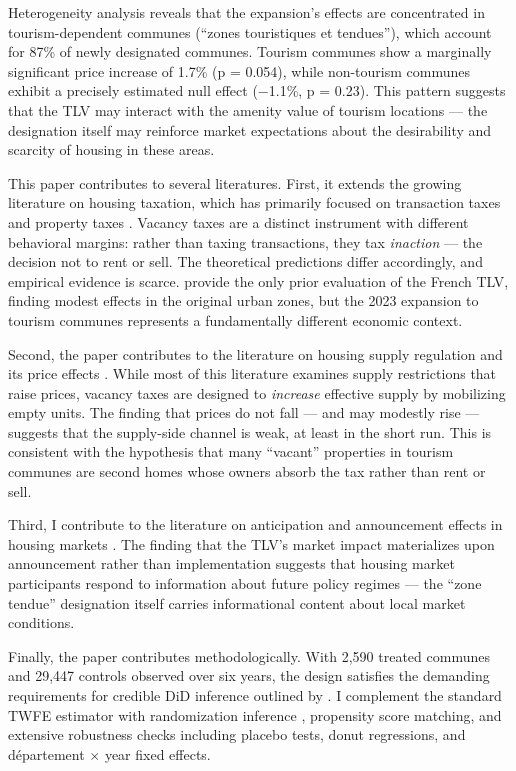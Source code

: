 \documentclass[12pt]{article}
\begin{document}
Heterogeneity analysis reveals that the expansion's effects are concentrated in tourism-dependent communes (``zones touristiques et tendues''), which account for 87\% of newly designated communes. Tourism communes show a marginally significant price increase of 1.7\% (p = 0.054), while non-tourism communes exhibit a precisely estimated null effect ($-$1.1\%, p = 0.23). This pattern suggests that the TLV may interact with the amenity value of tourism locations --- the designation itself may reinforce market expectations about the desirability and scarcity of housing in these areas.

This paper contributes to several literatures. First, it extends the growing literature on housing taxation, which has primarily focused on transaction taxes \citep{best2020, dachis2012, kopczuk2006} and property taxes \citep{saarimaa2012, eerola2021}. Vacancy taxes are a distinct instrument with different behavioral margins: rather than taxing transactions, they tax \textit{inaction} --- the decision not to rent or sell. The theoretical predictions differ accordingly, and empirical evidence is scarce. \citet{gravel2019} provide the only prior evaluation of the French TLV, finding modest effects in the original urban zones, but the 2023 expansion to tourism communes represents a fundamentally different economic context.

Second, the paper contributes to the literature on housing supply regulation and its price effects \citep{saiz2010, hilber2016, hsieh2019}. While most of this literature examines supply restrictions that raise prices, vacancy taxes are designed to \textit{increase} effective supply by mobilizing empty units. The finding that prices do not fall --- and may modestly rise --- suggests that the supply-side channel is weak, at least in the short run. This is consistent with the hypothesis that many ``vacant'' properties in tourism communes are second homes whose owners absorb the tax rather than rent or sell.

Third, I contribute to the literature on anticipation and announcement effects in housing markets \citep{mian2009, adelino2015}. The finding that the TLV's market impact materializes upon announcement rather than implementation suggests that housing market participants respond to information about future policy regimes --- the ``zone tendue'' designation itself carries informational content about local market conditions.

Finally, the paper contributes methodologically. With 2,590 treated communes and 29,447 controls observed over six years, the design satisfies the demanding requirements for credible DiD inference outlined by \citet{bertrand2004}. I complement the standard TWFE estimator with randomization inference \citep{fisher1935}, propensity score matching, and extensive robustness checks including placebo tests, donut regressions, and d\'epartement $\times$ year fixed effects.
\end{document}
